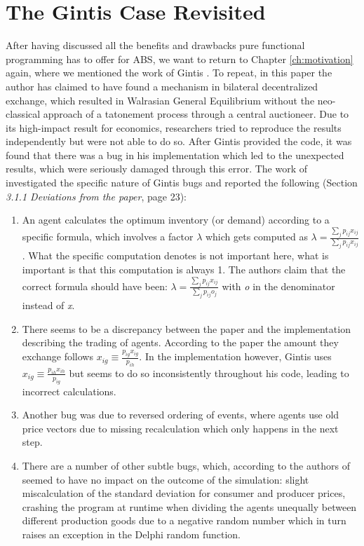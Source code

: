 \section{The Gintis Case Revisited}
\label{sec:gintis_case} 
After having discussed all the benefits and drawbacks pure functional programming has to offer for ABS, we want to return to Chapter \ref{ch:motivation} again, where we mentioned the work of Gintis \cite{gintis_emergence_2006}. To repeat, in this paper the author has claimed to have found a mechanism in bilateral decentralized exchange, which resulted in Walrasian General Equilibrium without the neo-classical approach of a tatonement process through a central auctioneer. Due to its high-impact result for economics, researchers \cite{botta2013mathematical} tried to reproduce the results independently but were not able to do so. After Gintis provided the code, it was found that there was a bug in his implementation which led to the unexpected results, which were seriously damaged through this error. The work of \cite{evensen_extensible_2010} investigated the specific nature of Gintis bugs and reported the following (Section \textit{3.1.1  Deviations from the paper}, page 23):

\begin{enumerate}
	\item An agent calculates the optimum inventory (or demand) according to a specific formula, which involves a factor $\lambda$ which gets computed as $\lambda = \frac{\sum_{j}{} p_{ij}x_{ij}}{\sum_{j}{} p_{ij}x_{ij}}$. What the specific computation denotes is not important here, what is important is that this computation is always 1. The authors \cite{evensen_extensible_2010} claim that the correct formula should have been: $\lambda = \frac{\sum_{j}{} p_{ij}x_{ij}}{\sum_{j}{} p_{ij}o_{j}}$ with \textit{o} in the denominator instead of \textit{x}. 
	
	\item There seems to be a discrepancy between the paper and the implementation describing the trading of agents. According to the paper the amount they exchange follows $x_{ig} \equiv \frac{p_{ig}x_{ig}}{p_{ih}}$. In the implementation however, Gintis uses $x_{ig} \equiv \frac{p_{ih}x_{ih}}{p_{ig}}$ but seems to do so inconsistently throughout his code, leading to incorrect calculations.
	
	\item Another bug was due to reversed ordering of events, where agents use old price vectors due to missing recalculation which only happens in the next step.

	\item There are a number of other subtle bugs, which, according to the authors of \cite{evensen_extensible_2010} seemed to have no impact on the outcome of the simulation: slight miscalculation of the standard deviation for consumer and producer prices, crashing the program at runtime when dividing the agents unequally between different production goods due to a negative random number which in turn raises an exception in the Delphi random function.
\end{enumerate}

